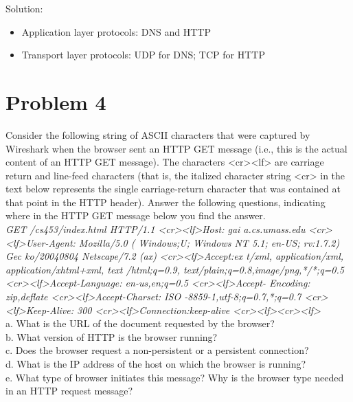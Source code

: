 \documentclass{article}
\begin{document}
\noindent Solution:\\
\begin{itemize}
\item Application layer protocols: DNS and HTTP
\item Transport layer protocols: UDP for DNS; TCP for HTTP
\end{itemize}

\newpage
\section{Problem 4} Consider the following string of ASCII characters that were captured by Wireshark when the browser sent an HTTP GET message (i.e., this is the actual content of an HTTP GET message). The characters <cr><lf> are carriage return and line-feed characters (that is, the italized character string <cr> in the text below represents the single carriage-return character that was contained at that point in the HTTP header). Answer the following questions, indicating where in the HTTP GET message below you find the answer.\\
\emph{GET /cs453/index.html HTTP/1.1 \textless cr\textgreater \textless lf\textgreater Host: gai a.cs.umass.edu \textless cr\textgreater  \textless lf\textgreater User-Agent: Mozilla/5.0 ( Windows;U; Windows NT 5.1; en-US; rv:1.7.2) Gec ko/20040804 Netscape/7.2 (ax)  \textless cr\textgreater  \textless lf\textgreater Accept:ex t/xml, application/xml, application/xhtml+xml, text /html;q=0.9, text/plain;q=0.8,image/png,*/*;q=0.5 \textless cr\textgreater  \textless lf\textgreater Accept-Language: en-us,en;q=0.5 \textless cr\textgreater  \textless lf\textgreater Accept- Encoding: zip,deflate \textless cr\textgreater  \textless lf\textgreater Accept-Charset: ISO -8859-1,utf-8;q=0.7,*;q=0.7 \textless cr\textgreater  \textless lf\textgreater Keep-Alive: 300 \textless cr\textgreater   \textless lf\textgreater Connection:keep-alive \textless cr\textgreater  \textless lf\textgreater  \textless cr\textgreater  \textless lf\textgreater }\\
a. What is the URL of the document requested by the browser?\\
b. What version of HTTP is the browser running?\\
c. Does the browser request a non-persistent or a persistent connection?\\
d. What is the IP address of the host on which the browser is running?\\
e. What type of browser initiates this message? Why is the browser type needed in an HTTP request message?\\
\end{document}
